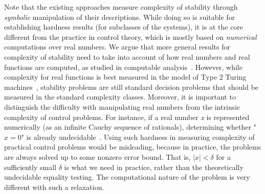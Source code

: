 \documentclass[10pt]{article}
\theoremstyle{plain}
\theoremstyle{definition}
\begin{document}
Note that the existing approaches measure complexity of stability through {\em symbolic} manipulation of their descriptions. While doing so is suitable for establishing hardness results (for subclasses of the systems), it is at the core different from the practice in control theory, which is mostly based on {\em numerical} computations over real numbers. We argue that more general results for complexity of stability need to take into account of how real numbers and real functions are computed, as studied in computable analysis~\cite{CAbook,Kobook,16557}. However, while complexity for real functions is best measured in the model of Type 2 Turing machines~\cite{Kobook}, stability problems are still standard decision problems that should be measured in the standard complexity classes. Moreover, it is important to distinguish the difficulty with manipulating real numbers from the intrinsic complexity of control problems. For instance, if a real number {\em x} is represented numerically (as an infinite Cauchy sequence of rationals), determining whether "$x=0$" is already undecidable~\cite{CAbook}. Using such hardness in measuring complexity of practical control problems would be misleading, because in practice, the problems are always solved up to some nonzero error bound. That is, $|x|<\delta$ for a sufficiently small $\delta$ is what we need in practice, rather than the theoretically undecidable equality testing. The computational nature of the problem is very different with such a relaxation. 
\end{document}
